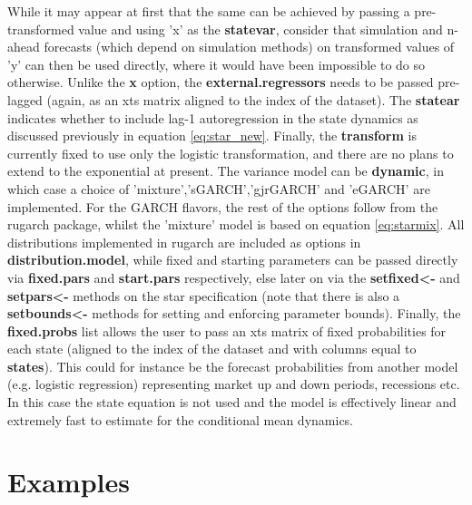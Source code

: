 While it may appear at first that the same can be achieved by passing a
pre-transformed value and using 'x' as the \textbf{statevar}, consider that
simulation and n-ahead forecasts (which depend on simulation methods) on
transformed values of 'y' can then be used directly, where it would have been
impossible to do so otherwise. Unlike the \textbf{x} option, the
\textbf{external.regressors} needs to be passed pre-lagged (again, as an xts
matrix aligned to the index of the dataset). The \textbf{statear} indicates
whether to include lag-1 autoregression in the state dynamics as discussed
previously in equation \ref{eq:star_new}.
Finally, the \textbf{transform} is currently fixed to use only the logistic
transformation, and there are no plans to extend to the exponential at present.
The variance model can be \textbf{dynamic}, in which case a choice of
'mixture','sGARCH','gjrGARCH' and 'eGARCH' are implemented. For the GARCH
flavors, the rest of the options follow from the rugarch package, whilst the
'mixture' model is based on equation \ref{eq:starmix}. All distributions
implemented in rugarch are included as options in \textbf{distribution.model},
while fixed and starting parameters can be passed directly via
\textbf{fixed.pars} and \textbf{start.pars} respectively, else later on via the
\textbf{setfixed<-} and \textbf{setpars<-} methods on the star specification
(note that there is also a \textbf{setbounds<-} methods for setting and
enforcing parameter bounds). Finally, the \textbf{fixed.probs} list allows the
user to pass an xts matrix of fixed probabilities for each state (aligned to
the index of the dataset and with columns equal to \textbf{states}). This could
for instance be the forecast probabilities from another model (e.g. logistic
regression) representing market up and down periods, recessions etc. In this
case the state equation is not used and the model is effectively linear and
extremely fast to estimate for the conditional mean dynamics.

\section{Examples}\label{sec:6}
